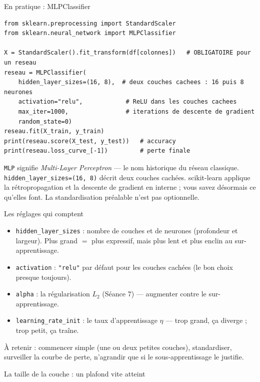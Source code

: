 \documentclass[aspectratio=169,11pt]{beamer}
\begin{document}
\begin{frame}[fragile]{En pratique : MLPClassifier}
\begin{lstlisting}
from sklearn.preprocessing import StandardScaler
from sklearn.neural_network import MLPClassifier

X = StandardScaler().fit_transform(df[colonnes])   # OBLIGATOIRE pour un reseau
reseau = MLPClassifier(
    hidden_layer_sizes=(16, 8),  # deux couches cachees : 16 puis 8 neurones
    activation="relu",            # ReLU dans les couches cachees
    max_iter=1000,                # iterations de descente de gradient
    random_state=0)
reseau.fit(X_train, y_train)
print(reseau.score(X_test, y_test))   # accuracy
print(reseau.loss_curve_[-1])         # perte finale
\end{lstlisting}
{\small \texttt{MLP} signifie \emph{Multi-Layer Perceptron} — le nom historique du réseau classique. \texttt{hidden\_layer\_sizes=(16, 8)} décrit deux couches cachées. scikit-learn applique la rétropropagation et la descente de gradient en interne ; vous savez désormais ce qu'elles font. La standardisation préalable n'est pas optionnelle.}
\end{frame}

\begin{frame}{Les réglages qui comptent}
\begin{ucadret}
\begin{itemize}\small
  \item \texttt{hidden\_layer\_sizes} : nombre de couches et de neurones (profondeur et largeur). Plus grand $=$ plus expressif, mais plus lent et plus enclin au sur-apprentissage.
  \item \texttt{activation} : \texttt{"relu"} par défaut pour les couches cachées (le bon choix presque toujours).
  \item \texttt{alpha} : la régularisation $L_2$ (Séance 7) — augmenter contre le sur-apprentissage.
  \item \texttt{learning\_rate\_init} : le taux d'apprentissage $\eta$ — trop grand, ça diverge ; trop petit, ça traîne.
\end{itemize}
\end{ucadret}
{\small À retenir : commencer simple (une ou deux petites couches), standardiser, surveiller la courbe de perte, n'agrandir que si le sous-apprentissage le justifie.}
\end{frame}

\begin{frame}{La taille de la couche : un plafond vite atteint}
\end{frame}
\end{document}
